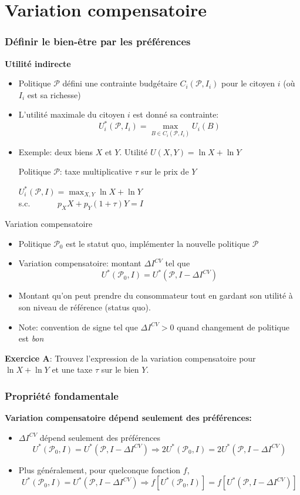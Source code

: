 \documentclass[handout]{beamer}
\newcommand{\mcl}{\mathcal}
\newcommand{\mdp}{\medskip \pause}
\begin{document}
\section{Variation compensatoire}

\begin{frame} \frametitle{Définir le bien-être par les préférences}
\textbf{Utilité indirecte} \begin{itemize}
\item
Politique $\mcl P$ défini une contrainte budgétaire $C_i(\mcl P,I_i)$ pour le citoyen $i$ (où $I_i$ est sa richesse)
\item L'utilité maximale du citoyen $i$ est donné sa contrainte: $$U_i^*(\mcl P,I_i) = \max_{B \in C_i(\mcl P, I_i)} U_i(B)$$
\item Exemple: deux biens $X$ et $Y$. Utilité $U(X,Y) = \ln X + \ln Y$ \medskip

Politique $\mcl P$: taxe multiplicative $\tau$ sur le prix de
$Y$\mdp

$U_i^*(\mcl P,I) = \max_{X,Y} \ln X + \ln Y$ \\ s.c. $\quad \quad \quad
p_X  X + p_Y(1 + \tau) Y = I$ \end{itemize}
\end{frame}

\begin{frame}{Variation compensatoire}
  \begin{itemize} \item Politique $\mcl P_0$ est le statut
quo, implémenter la nouvelle politique $\mcl P$ \item Variation compensatoire:  montant $\Delta I^{CV}$  tel que $$U^*(\mcl P_0,I) = U^*(\mcl P,
I - \Delta I^{CV})$$    \item    Montant qu'on peut prendre du consommateur tout en gardant son utilité à son niveau de référence (status quo).  

\item Note: convention de signe tel que  $\Delta I^{CV}>0$ quand changement de politique est \textit{bon} 

 \end{itemize}
 
 \textbf{Exercice A}: Trouvez l'expression de la variation compensatoire pour $\ln X + \ln Y$ et une taxe $\tau$ sur le bien $Y$. 
\end{frame}

\begin{frame} \frametitle{Propriété fondamentale}

\textbf{Variation compensatoire dépend seulement des préférences:} \begin{itemize} \item $\Delta I^{CV}$ dépend seulement des préférences $$U^*(\mcl P_0,I) = U^*(\mcl P, I - \Delta I^{CV})
\Rightarrow 2 U^*(\mcl P_0,I) = 2  U^*(\mcl P, I- \Delta I^{CV})$$ \item Plus généralement, pour quelconque fonction $f$, $$U^*(\mcl P_0,I) = U^*(\mcl P, I - \Delta I^{CV})
\Rightarrow f[U^*(\mcl P_0,I)] = f[ U^*(\mcl P, I - \Delta I^{CV})]$$\end{itemize}
 
\end{frame}
 
\end{document}
